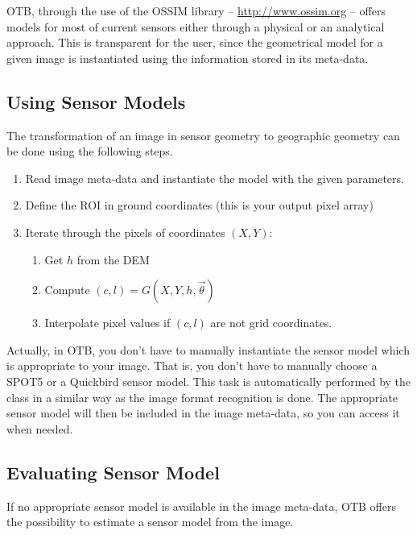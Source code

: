 OTB, through the use of the OSSIM library --
\url{http://www.ossim.org} -- offers models for most of current
sensors either through a physical or an analytical approach. This is
transparent for the user, since the geometrical model for a given
image is instantiated using the information stored in its meta-data.\\

\subsection{Using Sensor Models}
\label{sec:UsingSensorModels}

The transformation of an image in sensor geometry to geographic
geometry can be done using the following steps.
  \begin{enumerate}
    \item Read image meta-data and instantiate the model with the
    given parameters.
  \item Define the ROI in ground coordinates (this is your output
  pixel array)
  \item Iterate through the pixels of coordinates $(X,Y)$:
    \begin{enumerate}
      \item Get $h$ from the DEM
      \item Compute $(c,l) = G(X,Y,h,\vec\theta)$
      \item Interpolate pixel values if $(c,l)$ are not grid coordinates.
    \end{enumerate}
  \end{enumerate}

Actually, in OTB, you don't have to manually instantiate the sensor
model which is appropriate to your image. That is, you don't have to
manually choose a SPOT5 or a Quickbird sensor model. This task is
automatically performed by the  class in
a similar way as the image format recognition is done. The appropriate
sensor model will then be included in the image meta-data, so you can
access it when needed.

\ifitkFullVersion

\fi

\subsection{Evaluating Sensor Model}
\label{sec:EvaluatingSensorModels}

If no appropriate sensor model is available in the image meta-data,
OTB offers the possibility to estimate a sensor model from the image. 

